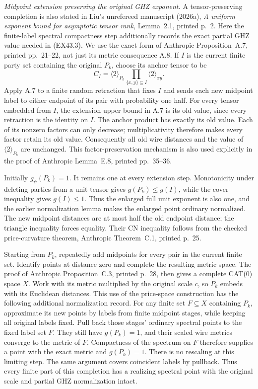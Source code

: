 \emph{Midpoint extension preserving the original GHZ exponent.}
A tensor-preserving completion is also stated in Liu's unrefereed manuscript (2026a),
\emph{A uniform exponent bound for asymptotic tensor rank},
Lemma~2.1, printed p.~2. Here the finite-label spectral compactness
step additionally records the exact partial GHZ value needed in
(EX43.3). We use the exact form of Anthropic Proposition~A.7, printed pp.~21--22,
not just its metric consequence A.8. If $I$ is the current finite party
set containing the original $P_k$, choose its anchor tensor to be
\[
 C_I=\langle2\rangle_{P_k}
           \prod_{\{x,y\}\subseteq I}\langle2\rangle_{xy}.
 \tag{EX43.4}
\]
Apply A.7 to a finite random retraction that fixes $I$ and sends each
new midpoint label to either endpoint of its pair with probability one
half. For every tensor embedded from $I$, the extension upper bound in
A.7 is its old value, since every retraction is the identity on $I$.
The anchor product has exactly its old value. Each of its nonzero
factors can only decrease; multiplicativity therefore makes every
factor retain its old value. Consequently all old wire distances and
the value of $\langle2\rangle_{P_k}$ are unchanged.
This factor-preservation mechanism is also used explicitly in the
proof of Anthropic Lemma~E.8, printed pp.~35--36.

Initially $g_\psi(P_k)=1$. It remains one at every extension step.
Monotonicity under deleting parties from a unit tensor gives
$g(P_k)\le g(I)$, while the cover inequality gives $g(I)\le1$.
Thus the enlarged full unit exponent is also one, and the earlier
normalization lemma makes the enlarged point ordinary normalized.
The new midpoint distances are at most half the old endpoint distance;
the triangle inequality forces equality. Their CN inequality follows
from the checked price-curvature theorem, Anthropic Theorem~C.1,
printed p.~25.

Starting from $P_k$, repeatedly add midpoints for every pair in the
current finite set. Identify points at distance zero and complete the
resulting metric space. The proof of Anthropic Proposition~C.3,
printed p.~28, then gives a complete CAT(0) space $X$. Work with its
metric multiplied by the original scale $c$, so $P_k$ embeds with its
Euclidean distances. This use of the price-space construction has the
following additional normalization record. For any finite set
$F\subseteq X$ containing $P_k$, approximate its new points by labels
from finite midpoint stages, while keeping all original labels fixed.
Pull back those stages' ordinary spectral points to the fixed label
set $F$. They still have $g(P_k)=1$, and their scaled wire metrics
converge to the metric of $F$. Compactness of the spectrum on $F$
therefore supplies a point with the exact metric and $g(P_k)=1$.
There is no rescaling at this limiting step. The same argument covers
coincident labels by pullback. Thus every finite part of this completion
has a realizing spectral point with the original scale and partial GHZ
normalization intact.

